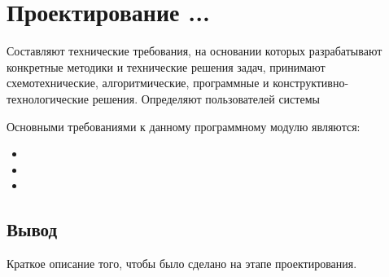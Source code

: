 \section{Проектирование ...}
\label{sec:designing}

Составляют технические требования, на основании которых разрабатывают конкретные методики и технические решения задач, принимают схемотехнические, алгоритмические, программные и конструктивно-технологические решения. Определяют пользователей системы

Основными требованиями к данному программному модулю являются:
\begin{itemize}
    \item 
    \item 
    \item 
\end{itemize}



\subsection{Вывод}
Краткое описание того, чтобы было сделано на этапе проектирования. 

